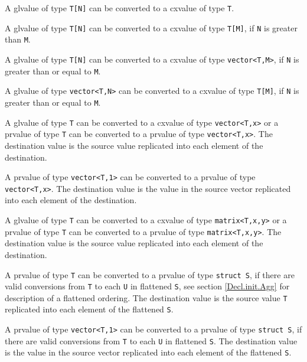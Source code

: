 \p A glvalue of type \texttt{T[N]} can be converted to a cxvalue of type \texttt{T}.

\p A glvalue of type \texttt{T[N]} can be converted to a cxvalue of type \texttt{T[M]},
if \texttt{N} is greater than \texttt{M}.

\p A glvalue of type \texttt{T[N]} can be converted to a cxvalue of type
\texttt{vector<T,M>}, if \texttt{N} is greater than or equal to \texttt{M}.

\p A glvalue of type \texttt{vector<T,N>} can be converted to a cxvalue of
type \texttt{T[M]}, if \texttt{N} is greater than or equal to \texttt{M}.


\p A glvalue of type \texttt{T} can be converted to a cxvalue of type
\texttt{vector<T,x>} or a prvalue of type \texttt{T} can be converted to a
prvalue of type \texttt{vector<T,x>}. The destination value is the source value
replicated into each element of the destination.

\p A prvalue of type \texttt{vector<T,1>} can be converted
to a prvalue of type \texttt{vector<T,x>}. The destination value is the value in
the source vector replicated into each element of the destination.

\p A glvalue of type \texttt{T} can be converted to a cxvalue of type
\texttt{matrix<T,x,y>} or a prvalue of type \texttt{T} can be converted to a
prvalue of type \texttt{matrix<T,x,y>}. The destination value is the source
value replicated into each element of the destination.


\p A prvalue of type \texttt{T} can be converted to a
prvalue of type \texttt{struct S}, if there are valid conversions from
\texttt{T} to each \texttt{U} in flattened \texttt{S}, see section
\ref{Decl.init.Agg} for description of a flattened ordering. The destination
value is the source value \texttt{T} replicated into each element of the
flattened \texttt{S}.

\p A prvalue of type \texttt{vector<T,1>} can be converted to a
prvalue of type \texttt{struct S}, if there are valid conversions from
\texttt{T} to each \texttt{U} in flattened \texttt{S}. The destination value is
the value in the source vector replicated into each element of the flattened
\texttt{S}.

